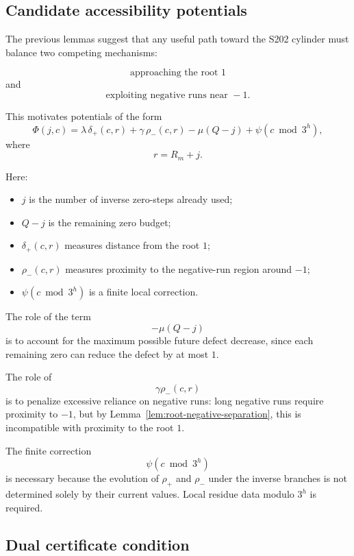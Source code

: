 \subsection{Candidate accessibility potentials}
\label{subsec:candidate-potentials}

The previous lemmas suggest that any useful path toward the S202 cylinder
must balance two competing mechanisms:

\[
\boxed{
\text{approaching the root }1
}
\]
and
\[
\boxed{
\text{exploiting negative runs near }-1.
}
\]

This motivates potentials of the form
\[
\Phi(j,c)
=
\lambda\,\delta_+(c,r)
+
\gamma\,\rho_-(c,r)
-
\mu(Q-j)
+
\psi(c\bmod 3^h),
\]
where
\[
r=R_m+j.
\]

Here:

\begin{itemize}
    \item \(j\) is the number of inverse zero-steps already used;
    \item \(Q-j\) is the remaining zero budget;
    \item \(\delta_+(c,r)\) measures distance from the root \(1\);
    \item \(\rho_-(c,r)\) measures proximity to the negative-run region
          around \(-1\);
    \item \(\psi(c\bmod3^h)\) is a finite local correction.
\end{itemize}

The role of the term
\[
-\mu(Q-j)
\]
is to account for the maximum possible future defect decrease, since each
remaining zero can reduce the defect by at most \(1\).

The role of
\[
\gamma\rho_-(c,r)
\]
is to penalize excessive reliance on negative runs: long negative runs
require proximity to \(-1\), but by
Lemma~\ref{lem:root-negative-separation}, this is incompatible with
proximity to the root \(1\).

The finite correction
\[
\psi(c\bmod3^h)
\]
is necessary because the evolution of \(\rho_+\) and \(\rho_-\) under the
inverse branches is not determined solely by their current values. Local
residue data modulo \(3^h\) is required.

\subsection{Dual certificate condition}
\label{subsec:dual-certificate-condition}

